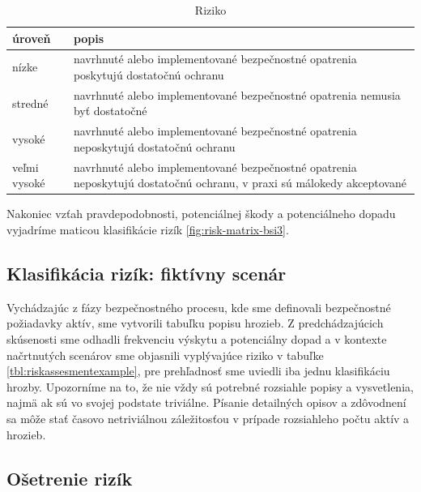 \begin{table}[!h]
    \caption{Riziko}
    \label{tab:thrimp}
    \begin{center}
        \footnotesize
        \begin{tabularx}{\textwidth}{|X|X|}
        \hline
        úroveň & popis \\
        \hline
        \hline
        nízke & navrhnuté alebo implementované bezpečnostné opatrenia poskytujú dostatočnú ochranu \\
        \hline
        stredné & navrhnuté alebo implementované bezpečnostné opatrenia nemusia byť dostatočné \\
        \hline
        vysoké & navrhnuté alebo implementované bezpečnostné opatrenia neposkytujú dostatočnú ochranu \\
        \hline
        veľmi vysoké & navrhnuté alebo implementované bezpečnostné opatrenia neposkytujú dostatočnú ochranu, v praxi sú málokedy akceptované \\
        \hline
        \end{tabularx}
    \end{center}
\end{table}

Nakoniec vzťah pravdepodobnosti, potenciálnej škody a potenciálneho dopadu vyjadríme maticou klasifikácie rizík \ref{fig:risk-matrix-bsi3}.


\subsection*{Klasifikácia rizík: fiktívny scenár}
Vychádzajúc z fázy bezpečnostného procesu, kde sme definovali bezpečnostné požiadavky aktív, sme vytvorili tabuľku popisu hrozieb. Z predchádzajúcich
skúsenosti sme odhadli frekvenciu výskytu a potenciálny dopad a v kontexte načrtnutých scenárov sme objasnili vyplývajúce riziko v tabuľke
\ref{tbl:riskassesmentexample}, pre prehľadnosť sme uviedli iba jednu klasifikáciu hrozby. Upozorníme na to, že nie vždy sú potrebné rozsiahle popisy
a vysvetlenia, najmä ak sú vo svojej podstate triviálne. Písanie detailných opisov a zdôvodnení sa môže stať časovo netriviálnou záležitosťou v prípade
rozsiahleho počtu aktív a hrozieb.


\newpage

\subsection{Ošetrenie rizík}

